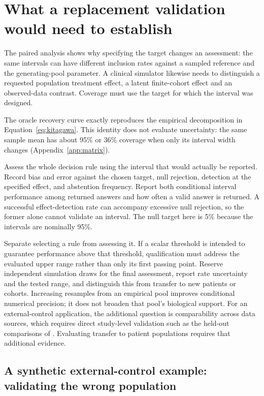 \section{What a replacement validation would need to establish}
\label{sec:validation}

The paired analysis shows why specifying the target changes an assessment:
the same intervals can have different inclusion rates against a sampled
reference and the generating-pool parameter. A clinical simulator likewise
needs to distinguish a requested population treatment effect, a latent
finite-cohort effect and an observed-data contrast. Coverage must use the
target for which the interval was designed.

The oracle recovery curve exactly reproduces the empirical decomposition in
Equation~\ref{eq:kitagawa}. This identity does not evaluate uncertainty:
the same sample mean has about 95\% or 36\% coverage when only its interval
width changes (Appendix~\ref{app:matrix}).

Assess the whole decision rule using the interval that would actually
be reported. Record bias and error against the chosen target, null rejection,
detection at the specified effect, and abstention frequency. Report both
conditional interval performance among returned answers and how often a valid
answer is returned. A successful effect-detection rate can accompany excessive
null rejection, so the former alone cannot validate an interval. The null target here is 5\% because the intervals are nominally 95\%.

Separate selecting a rule from assessing it. If a scalar threshold is
intended to guarantee performance above that threshold, qualification must
address the evaluated upper range rather than only its first passing point.
Reserve independent simulation draws for the final assessment, report rate
uncertainty and the tested range, and distinguish this from transfer to new
patients or cohorts. Increasing resamples from an empirical pool improves
conditional numerical precision; it does not broaden that pool's biological
support. For an external-control application, the additional question is
comparability across data sources, which requires direct study-level validation
such as the held-out comparisons of \citet{ventz2019}. Evaluating transfer to
patient populations requires that additional evidence.

\subsection{A synthetic external-control example: validating the wrong population}
\label{sec:eca}

